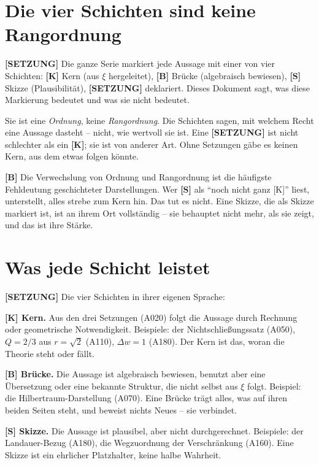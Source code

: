 \section{Die vier Schichten sind keine Rangordnung}

\textbf{[SETZUNG]} Die ganze Serie markiert jede Aussage mit einer von vier
Schichten: \textbf{[K]} Kern (aus $\xi$ hergeleitet), \textbf{[B]} Brücke
(algebraisch bewiesen), \textbf{[S]} Skizze (Plausibilität), \textbf{[SETZUNG]}
deklariert. Dieses Dokument sagt, was diese Markierung bedeutet und was sie
nicht bedeutet.

Sie ist eine \emph{Ordnung}, keine \emph{Rangordnung}. Die Schichten sagen, mit
welchem Recht eine Aussage dasteht -- nicht, wie wertvoll sie ist. Eine
\textbf{[SETZUNG]} ist nicht schlechter als ein \textbf{[K]}; sie ist von
anderer Art. Ohne Setzungen gäbe es keinen Kern, aus dem etwas folgen könnte.

\textbf{[B]} Die Verwechslung von Ordnung und Rangordnung ist die häufigste
Fehldeutung geschichteter Darstellungen. Wer \textbf{[S]} als \enquote{noch
nicht ganz [K]} liest, unterstellt, alles strebe zum Kern hin. Das tut es nicht.
Eine Skizze, die als Skizze markiert ist, ist an ihrem Ort vollständig -- sie
behauptet nicht mehr, als sie zeigt, und das ist ihre Stärke.

\section{Was jede Schicht leistet}

\textbf{[SETZUNG]} Die vier Schichten in ihrer eigenen Sprache:

\textbf{[K] Kern.} Aus den drei Setzungen (A020) folgt die Aussage durch
Rechnung oder geometrische Notwendigkeit. Beispiele: der Nichtschließungssatz
(A050), $Q=2/3$ aus $r=\sqrt2$ (A110), $\Delta w = 1$ (A180). Der Kern ist das,
woran die Theorie steht oder fällt.

\textbf{[B] Brücke.} Die Aussage ist algebraisch bewiesen, benutzt aber eine
Übersetzung oder eine bekannte Struktur, die nicht selbst aus $\xi$ folgt.
Beispiel: die Hilbertraum-Darstellung (A070). Eine Brücke trägt alles, was auf
ihren beiden Seiten steht, und beweist nichts Neues -- sie verbindet.

\textbf{[S] Skizze.} Die Aussage ist plausibel, aber nicht durchgerechnet.
Beispiele: der Landauer-Bezug (A180), die Wegzuordnung der Verschränkung (A160).
Eine Skizze ist ein ehrlicher Platzhalter, keine halbe Wahrheit.

